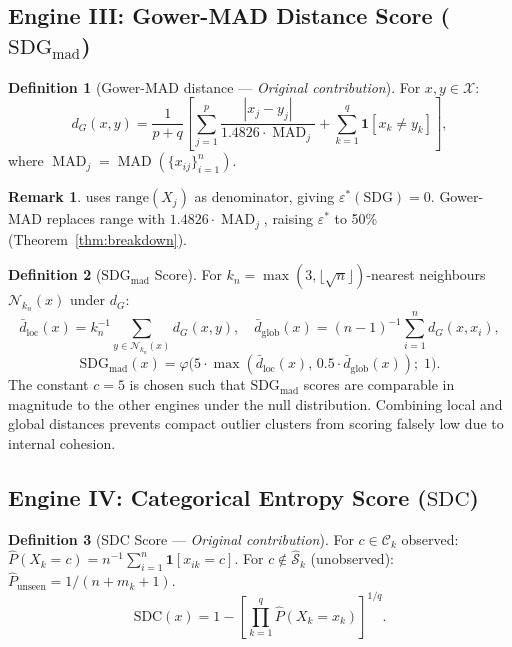 \documentclass[11pt]{article}
\theoremstyle{plain}
\theoremstyle{definition}
\newtheorem{definition}{Definition}
\newtheorem{remark}{Remark}
\DeclareMathOperator{\MAD}{MAD}
\newcommand{\C}{\mathcal{C}}
\newcommand{\X}{\mathcal{X}}
\begin{document}
\subsection{Engine III: Gower-MAD Distance Score
  ($\text{SDG}_\text{mad}$)}
\label{sec:engine3}

\begin{definition}[Gower-MAD distance
  --- \emph{Original contribution}]
\label{def:gower}
For $x, y \in \X$:
\[
  d_G(x, y) = \frac{1}{p+q}\!\left[
    \sum_{j=1}^{p} \frac{|x_j - y_j|}{1.4826\cdot\MAD_j}
    + \sum_{k=1}^{q} \mathbf{1}[x_k \neq y_k]
  \right],
\]
where $\MAD_j = \MAD(\{x_{ij}\}_{i=1}^n)$.
\end{definition}

\begin{remark}
\citet{gower1971} uses $\mathrm{range}(X_j)$ as
denominator, giving $\varepsilon^*(\text{SDG}) = 0$.
Gower-MAD replaces range with $1.4826\cdot\MAD_j$,
raising $\varepsilon^*$ to 50\%
(Theorem~\ref{thm:breakdown}).
\end{remark}

\begin{definition}[$\text{SDG}_\text{mad}$ Score]
\label{def:sgower}
For $k_n = \max(3, \lfloor\sqrt{n}\rfloor)$-nearest
neighbours $\mathcal{N}_{k_n}(x)$ under $d_G$:
\[
  \bar{d}_\text{loc}(x) = k_n^{-1}
  \!\sum_{y \in \mathcal{N}_{k_n}(x)}\! d_G(x,y),
  \quad
  \bar{d}_\text{glob}(x) = (n{-}1)^{-1}
  \!\sum_{i=1}^n d_G(x, x_i),
\]
\[
  \text{SDG}_\text{mad}(x) = \varphi\!\bigl(
  5\cdot\max(\bar{d}_\text{loc}(x),\,
  0.5\cdot\bar{d}_\text{glob}(x));\;1\bigr).
\]
The constant $c = 5$ is chosen such that
$\text{SDG}_\text{mad}$ scores are comparable in
magnitude to the other engines under the null
distribution. Combining local and global distances
prevents compact outlier clusters from scoring falsely
low due to internal cohesion.
\end{definition}

\subsection{Engine IV: Categorical Entropy Score
  ($\text{SDC}$)}
\label{sec:engine4}

\begin{definition}[SDC Score --- \emph{Original
  contribution}]
\label{def:sdc}
For $c \in \C_k$ observed: $\hat{P}(X_k = c) =
n^{-1}\sum_{i=1}^n \mathbf{1}[x_{ik}=c]$.
For $c \notin \hat{\mathcal{S}}_k$ (unobserved):
$\hat{P}_\text{unseen} = 1/(n + m_k + 1)$.
\[
  \text{SDC}(x) = 1 - \left[\prod_{k=1}^{q}
  \hat{P}(X_k = x_k)\right]^{1/q}.
\]
\end{definition}
\end{document}
